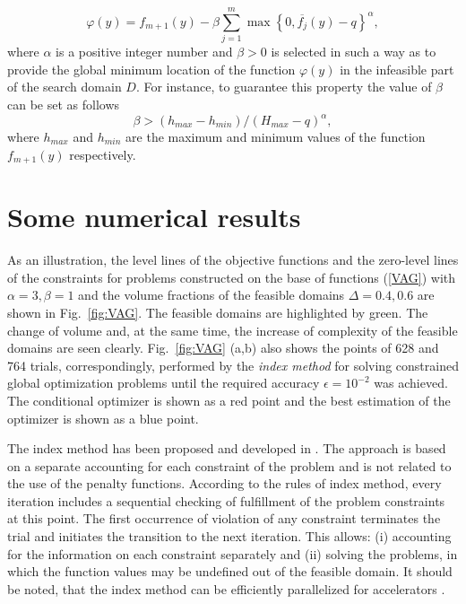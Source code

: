 \documentclass{llncs}
\begin{document}
\begin{enumerate}
\[
\varphi(y) = f_{m+1}(y)-\beta\sum_{j=1}^m\max\left\{0,\overline{f_j}(y) -q \right\}^\alpha,
\]
where $\alpha$ is a positive integer number and $\beta>0$ is selected in such a way as to provide the global minimum location of the function $\varphi(y)$ in the infeasible part of the search domain $D$. For instance, to guarantee this property the value of $\beta$ can be set as follows
\[
\beta>(h_{max}-h_{min})/(H_{max}-q)^\alpha,
\]
where $h_{max}$ and $h_{min}$ are the maximum and minimum values of the function $f_{m+1}(y)$ respectively.

\end{enumerate}

\section{Some numerical results}

As an illustration, the level lines of the objective functions and the zero-level lines of the constraints for problems constructed on the base of functions (\ref{VAG}) with $\alpha = 3, \beta = 1$ and the volume fractions of the feasible domains $\Delta = 0.4, 0.6$ are shown in Fig.~\ref{fig:VAG}. The feasible domains are highlighted by green. The change of volume and, at the same time, the increase of complexity of the feasible domains are seen clearly. Fig.~\ref{fig:VAG} (a,b) also shows the points of 628 and 764 trials, correspondingly, performed by the \textit{index method} for solving constrained global optimization problems until the required accuracy $\epsilon=10^{-2}$ was achieved. The conditional optimizer is shown as a red point and the best estimation of the optimizer is shown as a blue point.

The index method has been proposed and developed in \cite{Strongin2000,Barkalov2002}. The approach is based on a separate accounting for each constraint of the problem and is not related to the use of the penalty functions. According to the rules of index method, every iteration includes a sequential checking of fulfillment of the problem constraints at this point. The first occurrence of violation of any constraint terminates the trial and initiates the transition to the next iteration. This allows: (i) accounting for the information on each constraint separately and (ii) solving the problems, in which the function values may be undefined out of the feasible domain.  It should be noted, that the index method can be efficiently parallelized for accelerators \cite{Barkalov2015,Barkalov2016}.
\end{document}
